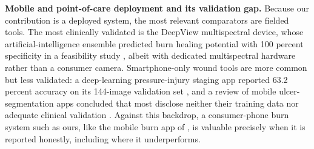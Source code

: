 \documentclass{melba}
\begin{document}
\textbf{Mobile and point-of-care deployment and its validation gap.} Because our contribution is a deployed system, the most relevant comparators are fielded tools. The most clinically validated is the DeepView multispectral device, whose artificial-intelligence ensemble predicted burn healing potential with 100 percent specificity in a feasibility study \citep{thatcher2023}, albeit with dedicated multispectral hardware rather than a consumer camera. Smartphone-only wound tools are more common but less validated: a deep-learning pressure-injury staging app reported 63.2 percent accuracy on its 144-image validation set \citep{lau2022}, and a review of mobile ulcer-segmentation apps concluded that most disclose neither their training data nor adequate clinical validation \citep{griffa2024}. Against this backdrop, a consumer-phone burn system such as ours, like the mobile burn app of \cite{yildiz}, is valuable precisely when it is reported honestly, including where it underperforms.
\end{document}
